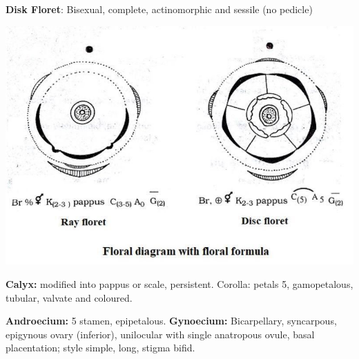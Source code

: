 \documentclass{article}
\begin{document}
\text{ }\newline
\textbf{Disk Floret}: Bisexual, complete, actinomorphic and sessile (no pedicle)
\begin{center}
    \includegraphics[scale=0.5]{images/3.jpg}
\end{center}
\text{ }\newline
\textbf{Calyx:} modified into pappus or scale, persistent.
Corolla: petals 5, gamopetalous, tubular, valvate and coloured.\newline

\textbf{Androecium:} 5 stamen, epipetalous.\newline
\textbf{Gynoecium:} Bicarpellary, syncarpous, epigynous ovary (inferior), unilocular with single anatropous ovule, basal placentation; style simple, long, stigma bifid.
\end{document}
